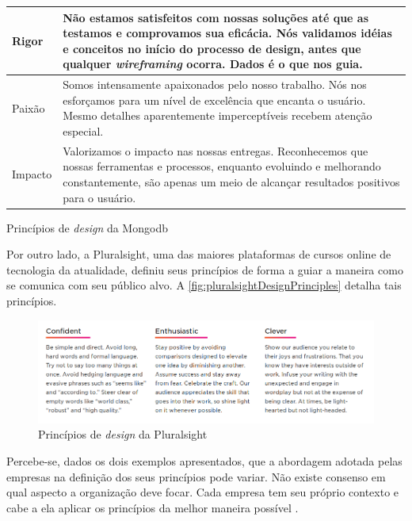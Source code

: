 \begin{quadro}[!htb]
\begin{tabular}{|m{2cm}|m{12cm}|}
		 Rigor & Não estamos satisfeitos com nossas soluções até que as testamos e comprovamos sua eficácia. Nós validamos idéias e conceitos no início do processo de design, antes que qualquer \textit{wireframing} ocorra. Dados é o que nos guia. \\\hline
		 
		 Paixão & Somos intensamente apaixonados pelo nosso trabalho. Nós nos esforçamos para um nível de excelência que encanta o usuário. Mesmo detalhes aparentemente imperceptíveis recebem atenção especial. \\\hline
		 
		 Impacto & Valorizamos o impacto nas nossas entregas. Reconhecemos que nossas ferramentas e processos, enquanto evoluindo e melhorando constantemente, são apenas um meio de alcançar resultados positivos para o usuário. \\\hline
			
	\end{tabular}
	\caption{Princípios de \textit{design} da Mongodb}
	\label{table:mongodbDesignPrinciples}
\end{quadro}

Por outro lado, a Pluralsight, uma das maiores plataformas de cursos online de tecnologia da atualidade, definiu seus princípios de forma a guiar a maneira como se comunica com seu público alvo. A \autoref{fig:pluralsightDesignPrinciples} detalha tais princípios.

\begin{figure}
	\includegraphics[width=\linewidth]{./04-figuras/02_referencial_teorico/pluralsight-principles.png}
	\caption{Princípios de \textit{design} da Pluralsight}
  \label{fig:pluralsightDesignPrinciples}
\end{figure}

Percebe-se, dados os dois exemplos apresentados, que a abordagem adotada pelas empresas na definição dos seus princípios pode variar. Não existe consenso em qual aspecto a organização deve focar. Cada empresa tem seu próprio contexto e cabe a ela aplicar os princípios da melhor maneira possível \cite{kholmatova2017design}.

